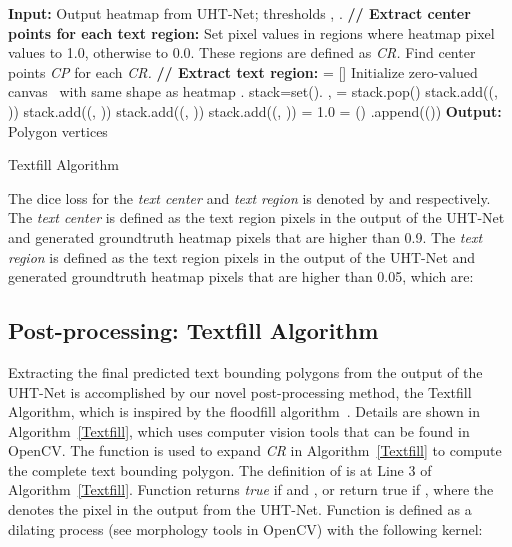 \documentclass[10pt,twocolumn,letterpaper]{article}
\begin{document}
\begin{algorithm}[t]
\label{tfa}
  \begin{algorithmic}[1]
    \State \textbf{Input:} Output heatmap  from UHT-Net; thresholds , .
    \State \textbf{\/// Extract center points for each text region:}
    \State Set pixel values in regions where heatmap  pixel values   to 1.0, otherwise to 0.0. These regions are defined as {\em CR.}
    \State Find center points {\em CP} for each {\em CR.} 
    \State \textbf{\/// Extract text region:}
    \State  = []
    \State Initialize zero-valued canvas~ with same shape as heatmap .
    \State stack=set().
    \State ,  = stack.pop()
\If {(, , , )}
    \State stack.add((, ))
    \EndIf
\If {(, , , )}
    \State stack.add((, ))
    \EndIf
\If {(, , , )}
    \State stack.add((, ))
    \EndIf
\If {(, , , )}
    \State stack.add((, ))
    \EndIf
    \EndWhile
    \State [stack] = 1.0
    \State  = ()
    \State .append(())
    \EndFor
    \State \textbf{Output:} Polygon vertices 
  \end{algorithmic}
  \caption{Textfill Algorithm}
  \label{Textfill}
\end{algorithm}

The dice loss \cite{diceloss} for the {\em text center} and {\em text region} is denoted by  and    respectively. The {\em text center} is defined as the text region pixels in the output of the UHT-Net and generated groundtruth heatmap pixels that are higher than 0.9. The {\em text region} is defined as the text region pixels in the output of the UHT-Net and generated groundtruth heatmap pixels that are higher than 0.05, which are:





\subsection{Post-processing: Textfill Algorithm}

Extracting the final predicted text bounding polygons from the output of the UHT-Net is accomplished by our novel post-processing method, the Textfill Algorithm, which is inspired by the floodfill algorithm~\cite{floodfill}. Details are shown in Algorithm~\ref{Textfill}, which uses computer vision tools that can be found in OpenCV. The function  is used to expand {\em CR} in Algorithm~\ref{Textfill} to compute the complete text bounding polygon. The definition of  is at Line 3 of Algorithm~\ref{Textfill}. Function  returns {\em true} if  and , or return true if , where the  denotes the pixel in the output from the UHT-Net. Function  is defined as a dilating process (see morphology tools in OpenCV) with the following kernel:
\end{document}
